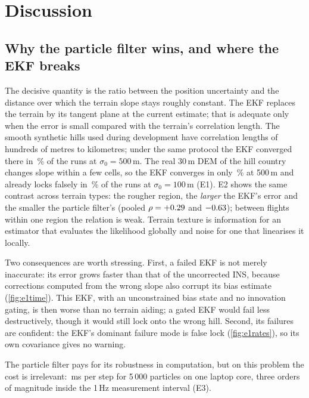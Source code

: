 \section{Discussion}\label{sec:discussion}

\subsection{Why the particle filter wins, and where the EKF breaks}
The decisive quantity is the ratio between the position uncertainty and the distance over which
the terrain slope stays roughly constant. The EKF replaces the terrain by its tangent plane at the
current estimate; that is adequate only when the error is small compared with the terrain's
correlation length. The smooth synthetic hills used during development have correlation lengths of
hundreds of metres to kilometres; under the same protocol the EKF converged there in
\EOneSynthSFiveZeroZeroEkfConv\,\% of the runs at $\sigma_0 = 500$\,m. The real 30\,m DEM of the hill
country changes slope within a few cells, so the EKF converges in only
\EOneHillSFiveZeroZeroEkfConv\,\% at 500\,m and already locks falsely in
\EOneHillSOneZeroZeroEkfFl\,\% of the runs at $\sigma_0 = 100$\,m (E1). E2 shows the same contrast
across terrain types: the rougher region, the \emph{larger} the EKF's error and the smaller the
particle filter's (pooled $\rho = +0.29$ and $-0.63$); between flights
within one region the relation is weak. Terrain texture is information for an estimator that
evaluates the likelihood globally and noise for one that linearises it locally.

Two consequences are worth stressing. First, a failed EKF is not merely inaccurate: its error
grows faster than that of the uncorrected INS, because corrections computed from the wrong slope
also corrupt its bias estimate (\cref{fig:e1time}). This EKF, with an unconstrained bias state and
no innovation gating, is then worse than no terrain aiding; a gated EKF would fail less
destructively, though it would still lock onto the wrong hill. Second, its failures are confident: the EKF's dominant
failure mode is false lock (\cref{fig:e1rates}), so its own covariance gives no warning.

The particle filter pays for its robustness in computation, but on this problem the cost is
irrelevant: \RtPfFiveZeroZeroZero\,ms per step for 5\,000 particles on one laptop core, three
orders of magnitude inside the 1\,Hz measurement interval (E3).

